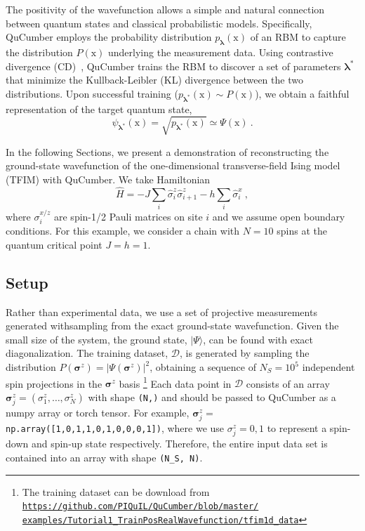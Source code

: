 \documentclass[submission, Phys, hidelnks]{SciPost}
\begin{document}
The positivity of the wavefunction allows a simple and natural connection between quantum states and classical probabilistic models. Specifically, QuCumber employs the probability distribution $p_{\bm{\lambda}}(\bm{\mathrm{x}})$ of an RBM to capture the distribution $P(\bm{\mathrm{x}})$ underlying the measurement data. Using contrastive divergence (CD)~\cite{hinton2002training}, QuCumber trains the RBM to discover a set of parameters $\bm{\lambda}^*$ that minimize the Kullback-Leibler (KL) divergence between the two distributions. Upon successful training ($p_{\bm{\lambda}^*}(\bm{\mathrm{x}})\sim P(\bm{\mathrm{x}})$), we obtain a faithful representation of the target quantum state,
\begin{equation}\label{wfpd}
    \psi_{\bm{\lambda}^*}(\bm{\mathrm{x}})= \sqrt{p_{\bm{\lambda}^*}(\bm{\mathrm{x}})}
    \simeq\Psi(\bm{\mathrm{x}})\:.
\end{equation} 

In the following Sections, we present a demonstration of reconstructing the ground-state wavefunction of the one-dimensional transverse-field Ising model (TFIM) with QuCumber. We take Hamiltonian
\begin{equation}
    \hat{H} = -J\sum_i \hat{\sigma}^z_i \hat{\sigma}^z_{i+1} - h \sum_i\hat{\sigma}^x_i\:, \label{TFIM}
\end{equation}
where $\sigma^{x/z}_i$ are spin-1/2 Pauli matrices on site $i$ and we assume open boundary conditions. For this example, we consider a chain with $N=10$ spins at the quantum critical point $J=h=1$.

\subsection{Setup}\label{subsec:example}
Rather than experimental data, we use a set of projective measurements generated withsampling from the exact ground-state wavefunction. Given the small size of the system, the ground state, $|\Psi\rangle$, can be found with exact diagonalization. The training dataset, $\mathcal{D}$, is generated by sampling the distribution $P(\bm{\sigma}^z)=|\Psi(\bm{\sigma}^z)|^2$, obtaining a sequence of $N_S=10^5$ independent spin projections in the $\bm{\sigma}^z$ basis
\footnote{The training dataset can be download from
    \href{https://github.com/PIQuIL/QuCumber/blob/master/examples/Tutorial1_TrainPosRealWavefunction/tfim1d_data.txt}{\texttt{https://github.com/PIQuIL/QuCumber/blob/master/\\examples/Tutorial1\_TrainPosRealWavefunction/tfim1d\_data}}
}
Each data point in $\mathcal{D}$ consists of an array $\bm{\sigma}^z_j=(\sigma^z_1,\dots,\sigma^z_N)$ with shape \verb|(N,)| and should be passed to QuCumber as a numpy array or torch tensor. For example, $\bm{\sigma}^z_j=$ \verb|np.array([1,0,1,1,0,1,0,0,0,1])|, where we use $\sigma_j^z=0,1$ to represent a spin-down and spin-up state respectively. Therefore, the entire input data set is contained into an array with shape \verb|(N_S, N)|.
\end{document}
